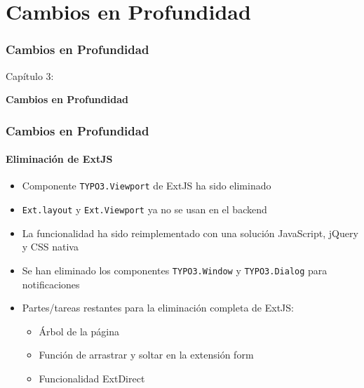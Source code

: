 %

\section{Cambios en Profundidad}
\begin{frame}[fragile]
	\frametitle{Cambios en Profundidad}

	\begin{center}\huge{Capítulo 3:}\end{center}
	\begin{center}\huge{\color{typo3darkgrey}\textbf{Cambios en Profundidad}}\end{center}

\end{frame}


\begin{frame}[fragile]
	\frametitle{Cambios en Profundidad}
	\framesubtitle{Eliminación de ExtJS}

	\begin{itemize}
		\item Componente \texttt{TYPO3.Viewport} de ExtJS ha sido eliminado
		\item \texttt{Ext.layout} y \texttt{Ext.Viewport} ya no se usan en el backend
		\item La funcionalidad ha sido reimplementado con una solución JavaScript, jQuery y CSS nativa
		\item Se han eliminado los componentes \texttt{TYPO3.Window} y \texttt{TYPO3.Dialog} para notificaciones
		\item Partes/tareas restantes para la eliminación completa de ExtJS:

		\begin{itemize}
			\item Árbol de la página
			\item Función de arrastrar y soltar en la extensión form
			\item Funcionalidad ExtDirect
		\end{itemize}

	\end{itemize}

\end{frame}

